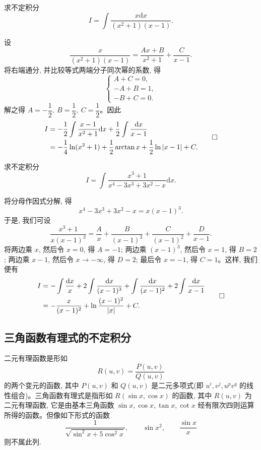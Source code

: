 \begin{example}\label{example:ma-6-3-1}
求不定积分
\[
  I=\int\frac{x\mathrm dx}{(x^2+1)(x-1)}.
\]
\end{example}

\begin{solve}
设
\[
  \frac{x}{(x^2+1)(x-1)}
  =
  \frac{Ax+B}{x^2+1}+\frac C{x-1}.
\]
将右端通分, 并比较等式两端分子同次幂的系数, 得
\[
  \begin{cases}
    A+C=0,\\
    -A+B=1,\\
    -B+C=0.
  \end{cases}
\]
解之得 $A=-\dfrac12,\ B=\dfrac12,\ C=\dfrac12$。因此
\[
\begin{aligned}
  I
  &=
  -\frac12\int\frac{x-1}{x^2+1}\mathrm dx+\frac12\int\frac{\mathrm dx}{x-1}\\
  &=
  -\frac14\ln(x^2+1)+\frac12\arctan x+\frac12\ln|x-1|+C.
\end{aligned}
\qedhere
\]
\end{solve}


\begin{example}\label{example:ma-6-3-2}
求不定积分
\[
  I=\int\frac{x^3+1}{x^4-3x^3+3x^2-x}\mathrm dx.
\]
\end{example}

\begin{solve}
将分母作因式分解, 得
\[
  x^4-3x^3+3x^2-x=x(x-1)^3.
\]
于是, 我们可设
\[
  \frac{x^3+1}{x(x-1)^3}
  =
  \frac Ax+\frac B{(x-1)^3}+\frac C{(x-1)^2}+\frac D{x-1}.
\]
将两边乘 $x$, 然后令 $x=0$, 得 $A=-1$; 两边乘 $(x-1)^3$, 然后令 $x=1$, 得 $B=2$; 两边乘 $x-1$, 然后令 $x\to-\infty$, 得 $D=2$; 最后令 $x=-1$, 得 $C=1$。这样, 我们便有
\[
\begin{aligned}
  I
  &=
  -\int\frac{\mathrm dx}x+2\int\frac{\mathrm dx}{(x-1)^3}
  +\int\frac{\mathrm dx}{(x-1)^2}+2\int\frac{\mathrm dx}{x-1}\\
  &=
  -\frac{x}{(x-1)^2}+\ln\frac{(x-1)^2}{|x|}+C.
\end{aligned}
\qedhere
\]
\end{solve}


\subsection{三角函数有理式的不定积分}
\label{subsec:ma-6-3-2}

二元有理函数是形如
\[
  R(u,v)=\frac{P(u,v)}{Q(u,v)}
\]
的两个变元的函数, 其中 $P(u,v)$ 和 $Q(u,v)$ 是二元多项式(即 $u^i,v^j,u^pv^q$ 的线性组合)。三角函数有理式是指形如 $R(\sin x,\cos x)$ 的函数, 其中 $R(u,v)$ 为二元有理函数, 它是由基本三角函数 $\sin x,\cos x,\tan x,\cot x$ 经有限次四则运算所得的函数。但像如下形式的函数
\[
  \frac1{\sqrt{\sin^2x+5\cos^2x}},\qquad
  \sin x^2,\qquad
  \frac{\sin x}{x}
\]
则不属此列.

